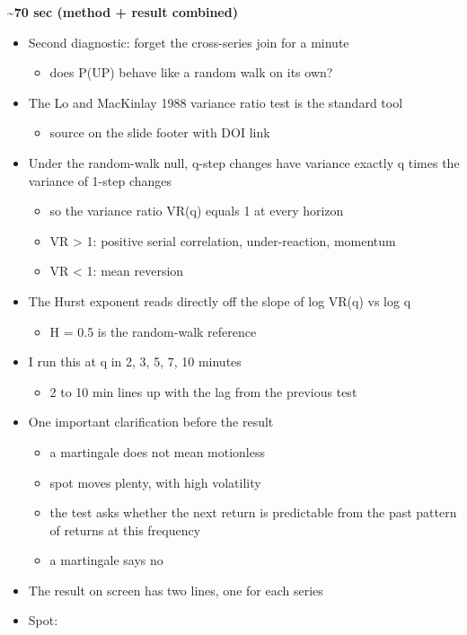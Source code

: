 \documentclass[
]{article}
\providecommand{\tightlist}{%
  \setlength{\itemsep}{0pt}\setlength{\parskip}{0pt}}
\begin{document}
\textbf{\textasciitilde70 sec (method + result combined)}

\begin{itemize}
\tightlist
\item
  Second diagnostic: forget the cross-series join for a minute

  \begin{itemize}
  \tightlist
  \item
    does P(UP) behave like a random walk on its own?
  \end{itemize}
\item
  The Lo and MacKinlay 1988 variance ratio test is the standard tool

  \begin{itemize}
  \tightlist
  \item
    source on the slide footer with DOI link
  \end{itemize}
\item
  Under the random-walk null, q-step changes have variance exactly q
  times the variance of 1-step changes

  \begin{itemize}
  \tightlist
  \item
    so the variance ratio VR(q) equals 1 at every horizon
  \item
    VR \textgreater{} 1: positive serial correlation, under-reaction,
    momentum
  \item
    VR \textless{} 1: mean reversion
  \end{itemize}
\item
  The Hurst exponent reads directly off the slope of log VR(q) vs log q

  \begin{itemize}
  \tightlist
  \item
    H = 0.5 is the random-walk reference
  \end{itemize}
\item
  I run this at q in 2, 3, 5, 7, 10 minutes

  \begin{itemize}
  \tightlist
  \item
    2 to 10 min lines up with the lag from the previous test
  \end{itemize}
\item
  One important clarification before the result

  \begin{itemize}
  \tightlist
  \item
    a martingale does not mean motionless
  \item
    spot moves plenty, with high volatility
  \item
    the test asks whether the next return is predictable from the past
    pattern of returns at this frequency
  \item
    a martingale says no
  \end{itemize}
\item
  The result on screen has two lines, one for each series
\item
  Spot:


\end{itemize}
\end{document}
